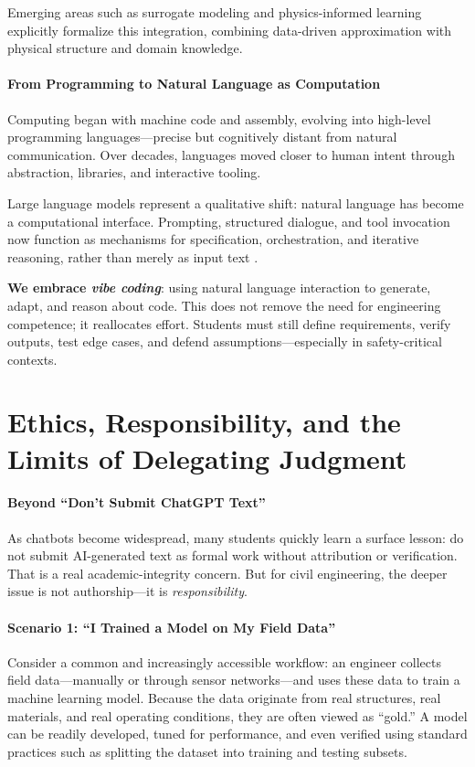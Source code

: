 \documentclass[12pt]{article}
\begin{document}
Emerging areas such as surrogate modeling and physics-informed learning explicitly formalize this integration, combining data-driven approximation with physical structure and domain knowledge.

\paragraph{From Programming to Natural Language as Computation}
Computing began with machine code and assembly, evolving into high-level programming languages—precise but cognitively distant from natural communication. Over decades, languages moved closer to human intent through abstraction, libraries, and interactive tooling.

Large language models represent a qualitative shift: natural language has become a computational interface. Prompting, structured dialogue, and tool invocation now function as mechanisms for specification, orchestration, and iterative reasoning, rather than merely as input text \cite{openai_gpt4o_system_card_2024,gemini_1_5_report_2024}.


\textbf{We embrace \emph{vibe coding}}: using natural language interaction to generate, adapt, and reason about code. This does not remove the need for engineering competence; it reallocates effort. Students must still define requirements, verify outputs, test edge cases, and defend assumptions—especially in safety-critical contexts.

\section*{Ethics, Responsibility, and the Limits of Delegating Judgment}
\paragraph{Beyond ``Don’t Submit ChatGPT Text''}
As chatbots become widespread, many students quickly learn a surface lesson: do not submit AI-generated text as formal work without attribution or verification. That is a real academic-integrity concern. But for civil engineering, the deeper issue is not authorship—it is \emph{responsibility}.

\paragraph{Scenario 1: ``I Trained a Model on My Field Data''}

Consider a common and increasingly accessible workflow: an engineer collects field data—manually or through sensor networks—and uses these data to train a machine learning model. Because the data originate from real structures, real materials, and real operating conditions, they are often viewed as ``gold.'' A model can be readily developed, tuned for performance, and even verified using standard practices such as splitting the dataset into training and testing subsets.
\end{document}
